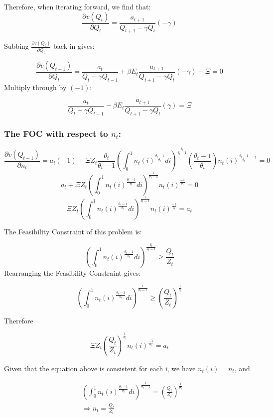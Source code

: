 \documentclass[11pt,preprint, authoryear]{elsarticle}
\numberwithin{equation}{section}
\numberwithin{figure}{section}
\numberwithin{table}{section}
\begin{document}
Therefore, when iterating forward, we find that:
\[\frac{\partial v(Q_{t})}{\partial Q_{t}} = \frac{a_{t+1}}{Q_{t+1}-\gamma Q_{t}} (-\gamma)\]

Subbing \(\frac{\partial v(Q_{t})}{\partial Q_{t}}\) back in gives:

\[\frac{\partial v(Q_{t-1})}{\partial Q_t} = \frac{a_t}{Q_t-\gamma Q_{t-1}} + \beta E_t\frac{a_{t+1}}{Q_{t+1}-\gamma Q_{t}} (-\gamma) - \Xi =0\]
Multiply through by \((-1)\):

\[ \frac{a_t}{Q_t-\gamma Q_{t-1}} - \beta E_t\frac{a_{t+1}}{Q_{t+1}-\gamma Q_{t}} (\gamma)  = \Xi \tag{14.0}\]

\hypertarget{the-foc-with-respect-to-n_t}{%
\subsubsection{\texorpdfstring{The FOC with respect to
\(n_t\):}{The FOC with respect to n\_t:}}\label{the-foc-with-respect-to-n_t}}

\[\frac{\partial v(Q_{t-1})}{\partial n_t} = a_t (-1) + \Xi Z_t \frac{\theta_t}{\theta_t -1} (\int_0^1n_t(i)^\frac{\theta_t -1}{\theta_t} di)^\frac{\theta_t}{\theta_t - 1} (\frac{\theta_t -1}{\theta_t}) n_t(i)^{\frac{\theta_t -1}{\theta_t}-1}=0\]
\[ a_t + \Xi Z_t  (\int_0^1n_t(i)^\frac{\theta_t -1}{\theta_t} di)^\frac{1}{\theta_t - 1} n_t(i)^{\frac{-1}{\theta_t}}=0\]
\[  \Xi Z_t  (\int_0^1n_t(i)^\frac{\theta_t -1}{\theta_t} di)^\frac{1}{\theta_t - 1} n_t(i)^{\frac{-1}{\theta_t}}=a_t\]

The Feasibility Constraint of this problem is:

\[(\int_0^1n_t(i)^\frac{\theta_t -1}{\theta_t} di)^\frac{\theta_t}{\theta_t - 1} \ge \frac{Q_t}{Z_t}\]
Rearranging the Feasibility Constraint gives:

\[(\int_0^1n_t(i)^\frac{\theta_t -1}{\theta_t} di)^\frac{1}{\theta_t - 1} \ge (\frac{Q_t}{Z_t})^\frac{1}{\theta_t}\]

Therefore

\[\Xi Z_t (\frac{Q_t}{Z_t})^\frac{1}{\theta_t}n_t(i)^{\frac{-1}{\theta_t}}=a_t\]

Given that the equation above is consistent for each i, we have
\(n_t(i)=n_t\), and

\[\begin{aligned}&(\int_0^1n_t(i)^\frac{\theta_t -1}{\theta_t} di)^\frac{1}{\theta_t - 1} = (\frac{Q_t}{Z_t})^\frac{1}{\theta_t}\\
&\Rightarrow n_t = \frac{Q_t}{Z_t}
\end{aligned}\]
\end{document}
